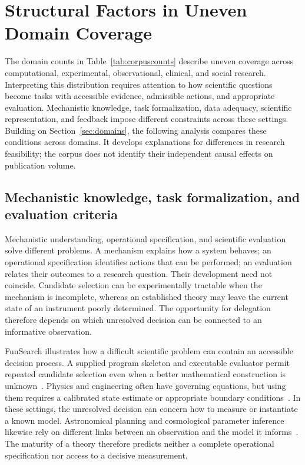 \section{Structural Factors in Uneven Domain Coverage}
\label{sec:coverage-imbalance}

The domain counts in Table~\ref{tab:corpuscounts} describe uneven coverage across computational, experimental, observational, clinical, and social research. Interpreting this distribution requires attention to how scientific questions become tasks with accessible evidence, admissible actions, and appropriate evaluation. Mechanistic knowledge, task formalization, data adequacy, scientific representation, and feedback impose different constraints across these settings. Building on Section~\ref{sec:domains}, the following analysis compares these conditions across domains. It develops explanations for differences in research feasibility; the corpus does not identify their independent causal effects on publication volume.

\subsection{Mechanistic knowledge, task formalization, and evaluation criteria}

Mechanistic understanding, operational specification, and scientific evaluation solve different problems. A mechanism explains how a system behaves; an operational specification identifies actions that can be performed; an evaluation relates their outcomes to a research question. Their development need not coincide. Candidate selection can be experimentally tractable when the mechanism is incomplete, whereas an established theory may leave the current state of an instrument poorly determined. The opportunity for delegation therefore depends on which unresolved decision can be connected to an informative observation.

FunSearch illustrates how a difficult scientific problem can contain an accessible decision process. A supplied program skeleton and executable evaluator permit repeated candidate selection even when a better mathematical construction is unknown~\cite{asd0512}. Physics and engineering often have governing equations, but using them requires a calibrated state estimate or appropriate boundary conditions~\cite{asd0090,asd0047}. In these settings, the unresolved decision can concern how to measure or instantiate a known model. Astronomical planning and cosmological parameter inference likewise rely on different links between an observation and the model it informs~\cite{asd0136,asd0121}. The maturity of a theory therefore predicts neither a complete operational specification nor access to a decisive measurement.

